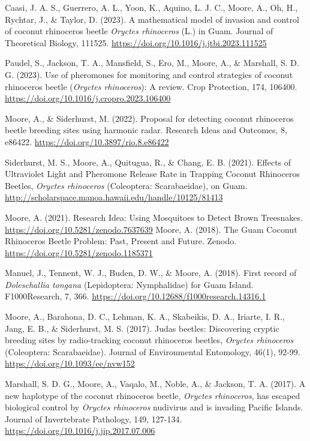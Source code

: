 \documentclass[12pt,english]{simplecv}
\begin{document}
\begin{thebibliography}{10}
\bibitem{} Caasi, J. A. S., Guerrero, A. L., Yoon, K., Aquino, L. J. C., Moore, A., Oh, H., Rychtar, J., \& Taylor, D. (2023). A mathematical model of invasion and control of coconut rhinoceros beetle \textit{Oryctes rhinoceros} (L.) in Guam. Journal of Theoretical Biology, 111525. \url{https://doi.org/10.1016/j.jtbi.2023.111525}

\bibitem{} Paudel, S., Jackson, T. A., Mansfield, S., Ero, M., Moore, A., \& Marshall, S. D. G. (2023). Use of pheromones for monitoring and control strategies of coconut rhinoceros beetle (\textit{Oryctes rhinoceros}): A review. Crop Protection, 174, 106400. \url{https://doi.org/10.1016/j.cropro.2023.106400}

\bibitem{} Moore, A., \& Siderhurst, M. (2022). Proposal for detecting coconut rhinoceros beetle breeding sites using harmonic radar. Research Ideas and Outcomes, 8, e86422. \url{https://doi.org/10.3897/rio.8.e86422}

\bibitem{} Siderhurst, M. S., Moore, A., Quitugua, R., \& Chang, E. B. (2021). Effects of Ultraviolet Light and Pheromone Release Rate in Trapping Coconut Rhinoceros Beetles, \textit{Oryctes rhinoceros} (Coleoptera: Scarabaeidae), on Guam. \url{http://scholarspace.manoa.hawaii.edu/handle/10125/81413}

\bibitem{} Moore, A. (2021). Research Idea: Using Mosquitoes to Detect Brown Treesnakes. \url{https://doi.org/10.5281/zenodo.7637639}
\bibitem{} Moore, A. (2018). The Guam Coconut Rhinoceros Beetle Problem: Past, Present and Future. Zenodo. \url{https://doi.org/10.5281/zenodo.1185371}

\bibitem{} Manuel, J., Tennent, W. J., Buden, D. W., \& Moore, A. (2018). First record of \textit{Doleschallia tongana} (Lepidoptera: Nymphalidae) for Guam Island. F1000Research, 7, 366. \url{https://doi.org/10.12688/f1000research.14316.1}

\bibitem{} Moore, A., Barahona, D. C., Lehman, K. A., Skabeikis, D. A., Iriarte, I. R., Jang, E. B., \& Siderhurst, M. S. (2017). Judas beetles: Discovering cryptic breeding sites by radio-tracking coconut rhinoceros beetles, \textit{Oryctes rhinoceros} (Coleoptera: Scarabaeidae). Journal of Environmental Entomology, 46(1), 92-99. \url{https://doi.org/10.1093/ee/nvw152}

\bibitem{} Marshall, S. D. G., Moore, A., Vaqalo, M., Noble, A., \& Jackson, T. A. (2017). A new haplotype of the coconut rhinoceros beetle, \textit{Oryctes rhinoceros}, has escaped biological control by \textit{Oryctes rhinoceros} nudivirus and is invading Pacific Islands. Journal of Invertebrate Pathology, 149, 127-134. \url{https://doi.org/10.1016/j.jip.2017.07.006}


\end{thebibliography}
\end{document}
